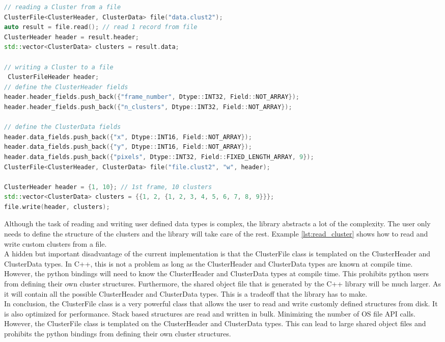 \begin{spacing}{1.2}
    \begin{lstlisting}[language=C++, caption={Example: Reading and writing a Cluster from a file},label={lst:read_cluster}]
// reading a Cluster from a file
ClusterFile<ClusterHeader, ClusterData> file("data.clust2");
auto result = file.read(); // read 1 record from file
ClusterHeader header = result.header;
std::vector<ClusterData> clusters = result.data;

// writing a Cluster to a file
 ClusterFileHeader header;
// define the ClusterHeader fields
header.header_fields.push_back({"frame_number", Dtype::INT32, Field::NOT_ARRAY});
header.header_fields.push_back({"n_clusters", Dtype::INT32, Field::NOT_ARRAY});

// define the ClusterData fields
header.data_fields.push_back({"x", Dtype::INT16, Field::NOT_ARRAY});
header.data_fields.push_back({"y", Dtype::INT16, Field::NOT_ARRAY});
header.data_fields.push_back({"pixels", Dtype::INT32, Field::FIXED_LENGTH_ARRAY, 9});
ClusterFile<ClusterHeader, ClusterData> file("file.clust2", "w", header);

ClusterHeader header = {1, 10}; // 1st frame, 10 clusters
std::vector<ClusterData> clusters = {{1, 2, {1, 2, 3, 4, 5, 6, 7, 8, 9}}};
file.write(header, clusters);
\end{lstlisting}


    Although the task of reading and writing user defined data types is complex, the library
    abstracts a lot of the complexity. The user only needs to define the structure of the clusters
    and the library will take care of the rest. Example \ref{lst:read_cluster} shows how to read
    and write custom clusters from a file.\\

    A hidden but important disadvantage of the current implementation is that the ClusterFile
    class is templated on the ClusterHeader and ClusterData types. In C++, this is not a problem
    as long as the ClusterHeader and ClusterData types are known at compile time. However, the python
    bindings will need to know the ClusterHeader and ClusterData types at compile time. This prohibits
    python users from defining their own cluster structures. Furthermore, the shared object file
    that is generated by the C++ library will be much larger. As it will contain all the possible
    ClusterHeader and ClusterData types. This is a tradeoff that the library has to make.\\

    In conclusion, the ClusterFile class is a very powerful class that allows the user to read
    and write customly defined structures from disk. It is also optimized for performance. Stack
    based structures are read and written in bulk. Minimizing the number of OS file API calls.
    However, the ClusterFile class is templated on the ClusterHeader and ClusterData types. This
    can lead to large shared object files and prohibits the python bindings from defining their
    own cluster structures.\\



\end{spacing}
